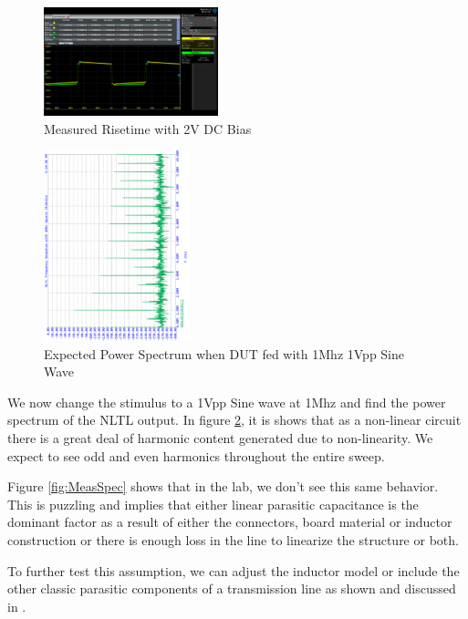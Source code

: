 \documentclass[journal]{IEEEtran} \usepackage[english]{babel}
\begin{document}
\begin{figure}[htb]
\centering
\includegraphics[width=0.45\textwidth]{MeasuredSquare2VBiasB1.png}
\caption{Measured Risetime with 2V DC Bias}
\label{fig:MeasSquare2VBiasB1}
\end{figure}


\begin{figure}[htb]
\centering
\includegraphics[width=0.38\textwidth,angle=-90]{SimulatedSpectrum.png}
\caption{Expected Power Spectrum when DUT fed with 1Mhz 1Vpp Sine Wave}
\label{fig:SimSpec}
\end{figure}

We now change the stimulus to a 1Vpp Sine wave at 1Mhz and find the power
spectrum of the NLTL output. In figure \ref{fig:SimSpec}, it is shows that as a non-linear
circuit there is a great deal of harmonic content generated due to
non-linearity. We expect to see odd and even harmonics throughout the entire
sweep. 

Figure \ref{fig:MeasSpec} shows that in the lab, we don't see this same
behavior. This is puzzling and implies that either linear parasitic capacitance
is the dominant factor as a result of either the connectors, board material or
inductor construction or there is enough loss in the line to linearize the
structure or both. 

To further test this assumption, we can adjust the inductor model or include the
other classic parasitic components of a transmission line as shown and discussed
in \cite{nikoo2018theory}.
\end{document}
